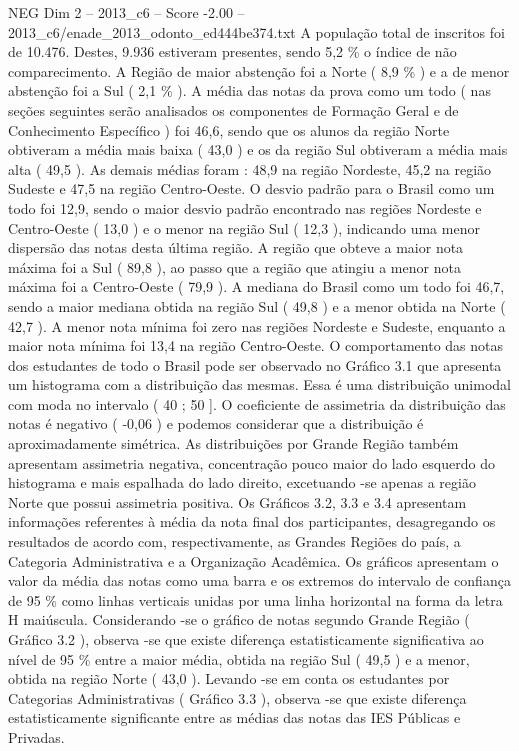\begin{textsample}{NEG Dim 2 – 2013\_c6 – Score -2.00 – 2013\_c6/enade\_2013\_odonto\_ed444be374.txt}
A população total de inscritos foi de 10.476.
Destes, 9.936 estiveram presentes, sendo 5,2 \% o índice de não comparecimento.
A Região de maior abstenção foi a Norte ( 8,9 \% ) e a de menor abstenção foi a Sul ( 2,1 \% ).
A média das notas da prova como um todo ( nas seções seguintes serão analisados os componentes de Formação Geral e de Conhecimento Específico ) foi 46,6, sendo que os alunos da região Norte obtiveram a média mais baixa ( 43,0 ) e os da região Sul obtiveram a média mais alta ( 49,5 ).
As demais médias foram : 48,9 na região Nordeste, 45,2 na região Sudeste e 47,5 na região Centro-Oeste.
O desvio padrão para o Brasil como um todo foi 12,9, sendo o maior desvio padrão encontrado nas regiões Nordeste e Centro-Oeste ( 13,0 ) e o menor na região Sul ( 12,3 ), indicando uma menor dispersão das notas desta última região.
A região que obteve a maior nota máxima foi a Sul ( 89,8 ), ao passo que a região que atingiu a menor nota máxima foi a Centro-Oeste ( 79,9 ).
A mediana do Brasil como um todo foi 46,7, sendo a maior mediana obtida na região Sul ( 49,8 ) e a menor obtida na Norte ( 42,7 ).
A menor nota mínima foi zero nas regiões Nordeste e Sudeste, enquanto a maior nota mínima foi 13,4 na região Centro-Oeste.
O comportamento das notas dos estudantes de todo o Brasil pode ser observado no Gráfico 3.1 que apresenta um histograma com a distribuição das mesmas.
Essa é uma distribuição unimodal com moda no intervalo ( 40 ; 50 ].
O coeficiente de assimetria da distribuição das notas é negativo ( -0,06 ) e podemos considerar que a distribuição é aproximadamente simétrica.
As distribuições por Grande Região também apresentam assimetria negativa, concentração pouco maior do lado esquerdo do histograma e mais espalhada do lado direito, excetuando -se apenas a região Norte que possui assimetria positiva.
Os Gráficos 3.2, 3.3 e 3.4 apresentam informações referentes à média da nota final dos participantes, desagregando os resultados de acordo com, respectivamente, as Grandes Regiões do país, a Categoria Administrativa e a Organização Acadêmica.
Os gráficos apresentam o valor da média das notas como uma barra e os extremos do intervalo de confiança de 95 \% como linhas verticais unidas por uma linha horizontal na forma da letra H maiúscula.
Considerando -se o gráfico de notas segundo Grande Região ( Gráfico 3.2 ), observa -se que existe diferença estatisticamente significativa ao nível de 95 \% entre a maior média, obtida na região Sul ( 49,5 ) e a menor, obtida na região Norte ( 43,0 ).
Levando -se em conta os estudantes por Categorias Administrativas ( Gráfico 3.3 ), observa -se que existe diferença estatisticamente significante entre as médias das notas das IES Públicas e Privadas.

\end{textsample}
